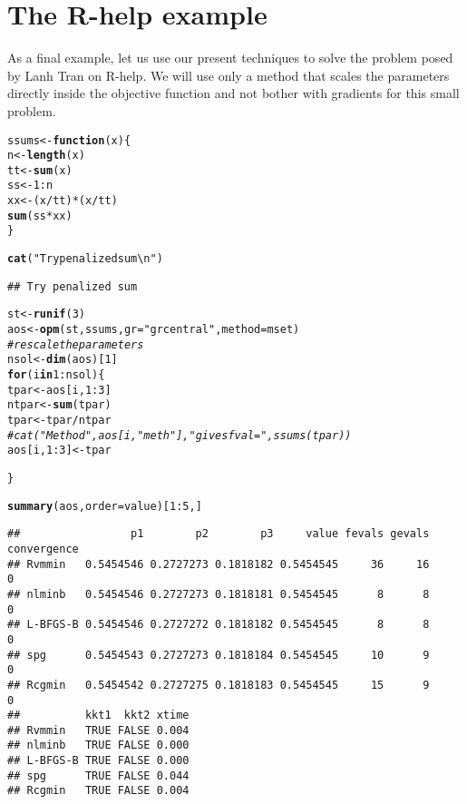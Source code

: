\documentclass[11pt]{article}\usepackage[]{graphicx}\usepackage[]{color}
\makeatletter
\newcommand{\hlnum}[1]{\textcolor[rgb]{0.686,0.059,0.569}{#1}}%
\newcommand{\hlstr}[1]{\textcolor[rgb]{0.192,0.494,0.8}{#1}}%
\newcommand{\hlcom}[1]{\textcolor[rgb]{0.678,0.584,0.686}{\textit{#1}}}%
\newcommand{\hlopt}[1]{\textcolor[rgb]{0,0,0}{#1}}%
\newcommand{\hlstd}[1]{\textcolor[rgb]{0.345,0.345,0.345}{#1}}%
\newcommand{\hlkwa}[1]{\textcolor[rgb]{0.161,0.373,0.58}{\textbf{#1}}}%
\newcommand{\hlkwb}[1]{\textcolor[rgb]{0.69,0.353,0.396}{#1}}%
\newcommand{\hlkwc}[1]{\textcolor[rgb]{0.333,0.667,0.333}{#1}}%
\newcommand{\hlkwd}[1]{\textcolor[rgb]{0.737,0.353,0.396}{\textbf{#1}}}%
\newenvironment{kframe}{%
 \def\at@end@of@kframe{}%
 \ifinner\ifhmode%
  \def\at@end@of@kframe{\end{minipage}}%
  \begin{minipage}{\columnwidth}%
 \fi\fi%
 \def\FrameCommand##1{\hskip\@totalleftmargin \hskip-\fboxsep
 \colorbox{shadecolor}{##1}\hskip-\fboxsep
     \hskip-\linewidth \hskip-\@totalleftmargin \hskip\columnwidth}%
 \MakeFramed {\advance\hsize-\width
   \@totalleftmargin\z@ \linewidth\hsize
   \@setminipage}}%
 {\par\unskip\endMakeFramed%
 \at@end@of@kframe}
\newenvironment{knitrout}{}{} %
\makeatother
\begin{document}
\section{The R-help example}

As a final example, let us use our present techniques to solve the 
problem posed by Lanh Tran on R-help. We will use
only a method that scales the parameters directly inside the objective function and 
not bother with gradients for this small problem. 

\begin{knitrout}\scriptsize
{}\color{fgcolor}\begin{kframe}
\begin{alltt}
\hlstd{ssums}\hlkwb{<-}\hlkwa{function}\hlstd{(}\hlkwc{x}\hlstd{)\{}
  \hlstd{n}\hlkwb{<-}\hlkwd{length}\hlstd{(x)}
  \hlstd{tt}\hlkwb{<-}\hlkwd{sum}\hlstd{(x)}
  \hlstd{ss}\hlkwb{<-}\hlnum{1}\hlopt{:}\hlstd{n}
  \hlstd{xx}\hlkwb{<-}\hlstd{(x}\hlopt{/}\hlstd{tt)}\hlopt{*}\hlstd{(x}\hlopt{/}\hlstd{tt)}
  \hlkwd{sum}\hlstd{(ss}\hlopt{*}\hlstd{xx)}
\hlstd{\}}

\hlkwd{cat}\hlstd{(}\hlstr{"Try penalized sum\textbackslash{}n"}\hlstd{)}
\end{alltt}
\begin{verbatim}
## Try penalized sum
\end{verbatim}
\begin{alltt}
\hlstd{st}\hlkwb{<-}\hlkwd{runif}\hlstd{(}\hlnum{3}\hlstd{)}
\hlstd{aos}\hlkwb{<-}\hlkwd{opm}\hlstd{(st, ssums,} \hlkwc{gr}\hlstd{=}\hlstr{"grcentral"}\hlstd{,} \hlkwc{method}\hlstd{=mset)}
\hlcom{# rescale the parameters}
\hlstd{nsol}\hlkwb{<-}\hlkwd{dim}\hlstd{(aos)[}\hlnum{1}\hlstd{]}
\hlkwa{for} \hlstd{(i} \hlkwa{in} \hlnum{1}\hlopt{:}\hlstd{nsol)\{}
  \hlstd{tpar}\hlkwb{<-}\hlstd{aos[i,}\hlnum{1}\hlopt{:}\hlnum{3}\hlstd{]}
  \hlstd{ntpar}\hlkwb{<-}\hlkwd{sum}\hlstd{(tpar)}
  \hlstd{tpar}\hlkwb{<-}\hlstd{tpar}\hlopt{/}\hlstd{ntpar}
\hlcom{#  cat("Method ",aos[i, "meth"]," gives fval =", ssums(tpar))}
  \hlstd{aos[i,} \hlnum{1}\hlopt{:}\hlnum{3}\hlstd{]}\hlkwb{<-}\hlstd{tpar}

\hlstd{\}}

\hlkwd{summary}\hlstd{(aos,}\hlkwc{order}\hlstd{=value)[}\hlnum{1}\hlopt{:}\hlnum{5}\hlstd{,]}
\end{alltt}
\begin{verbatim}
##                 p1        p2        p3     value fevals gevals convergence
## Rvmmin   0.5454546 0.2727273 0.1818182 0.5454545     36     16           0
## nlminb   0.5454546 0.2727273 0.1818181 0.5454545      8      8           0
## L-BFGS-B 0.5454546 0.2727272 0.1818182 0.5454545      8      8           0
## spg      0.5454543 0.2727273 0.1818184 0.5454545     10      9           0
## Rcgmin   0.5454542 0.2727275 0.1818183 0.5454545     15      9           0
##          kkt1  kkt2 xtime
## Rvmmin   TRUE FALSE 0.004
## nlminb   TRUE FALSE 0.000
## L-BFGS-B TRUE FALSE 0.000
## spg      TRUE FALSE 0.044
## Rcgmin   TRUE FALSE 0.004
\end{verbatim}
\end{kframe}
\end{knitrout}
\end{document}
